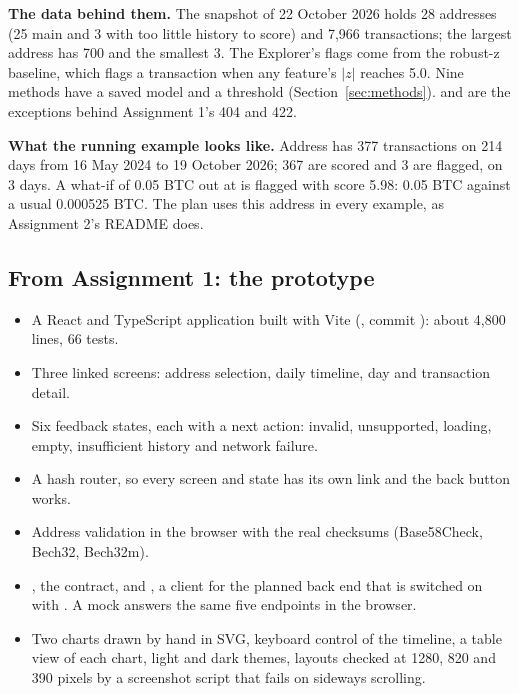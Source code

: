 \textbf{The data behind them.} The snapshot of 22 October 2026 holds 28 addresses (25 main and 3
with too little history to score) and 7,966 transactions; the largest address has 700 and the
smallest 3. The Explorer's flags come from the robust-z baseline, which flags a transaction when any
feature's $|z|$ reaches 5.0. Nine methods have a saved model and a threshold
(Section~\ref{sec:methods}).  and  are the exceptions
behind Assignment 1's 404 and 422.

\textbf{What the running example looks like.} Address
 has 377 transactions on 214 days from 16 May 2024 to
19 October 2026; 367 are scored and 3 are flagged, on 3 days. A what-if of 0.05 BTC out at
 is flagged with score 5.98: 0.05 BTC against a usual 0.000525 BTC. The
plan uses this address in every example, as Assignment 2's README does.

\subsection{From Assignment 1: the prototype}

\begin{itemize}
  \item A React and TypeScript application built with Vite (, commit
    ): about 4,800 lines, 66 tests.
  \item Three linked screens: address selection, daily timeline, day and transaction detail.
  \item Six feedback states, each with a next action: invalid, unsupported, loading, empty,
    insufficient history and network failure.
  \item A hash router, so every screen and state has its own link and the back button works.
  \item Address validation in the browser with the real checksums (Base58Check, Bech32, Bech32m).
  \item {}, the contract, and , a client for the planned
    back end that is switched on with . A mock answers the same five
    endpoints in the browser.
  \item Two charts drawn by hand in SVG, keyboard control of the timeline, a table view of each
    chart, light and dark themes, layouts checked at 1280, 820 and 390 pixels by a screenshot script
    that fails on sideways scrolling.
\end{itemize}

